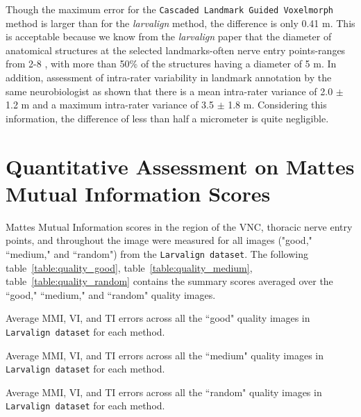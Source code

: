 \documentclass{book}
\begin{document}
	Though the maximum error for the \texttt{Cascaded Landmark Guided Voxelmorph} method is larger than for the \textit{larvalign} method, the difference is only 0.41 \textmu m. This is acceptable because we know from the \textit{larvalign} paper that the diameter of anatomical structures at the selected landmarks-often nerve entry points-ranges from 2-8 \textmu, with more than 50\% of the structures having a diameter of 5 m. In addition, assessment of intra-rater variability in landmark annotation by the same neurobiologist as shown that there is a mean intra-rater variance of 2.0 $\pm$ 1.2 \textmu m and a maximum intra-rater variance of 3.5 $\pm$ 1.8 \textmu m. Considering this information, the difference of less than half a micrometer is quite negligible.
	
	\section{Quantitative Assessment on Mattes Mutual Information Scores}
	Mattes Mutual Information scores in the region of the VNC, thoracic nerve entry points, and throughout the image were measured for all images ("good," ``medium," and ``random") from the \texttt{Larvalign dataset}. The following table~\ref{table:quality_good}, table~\ref{table:quality_medium}, table~\ref{table:quality_random} contains the summary scores averaged over the ``good," ``medium," and ``random" quality images.
	
	\begin{table}[h!]
		\centering
		
		\caption{Average MMI, VI, and TI errors across all the ``good" quality images in \texttt{Larvalign dataset} for each method.}
		\label{table:quality_good}
	\end{table}
	
	\begin{table}[h!]
		\centering
		
		\caption{Average MMI, VI, and TI errors across all the ``medium" quality images in \texttt{Larvalign dataset} for each method.}
		\label{table:quality_medium}
	\end{table}
	
	\begin{table}[h!]
		\centering
		
		\caption{Average MMI, VI, and TI errors across all the ``random" quality images in \texttt{Larvalign dataset} for each method.}
		\label{table:quality_random}
	\end{table}
\end{document}
